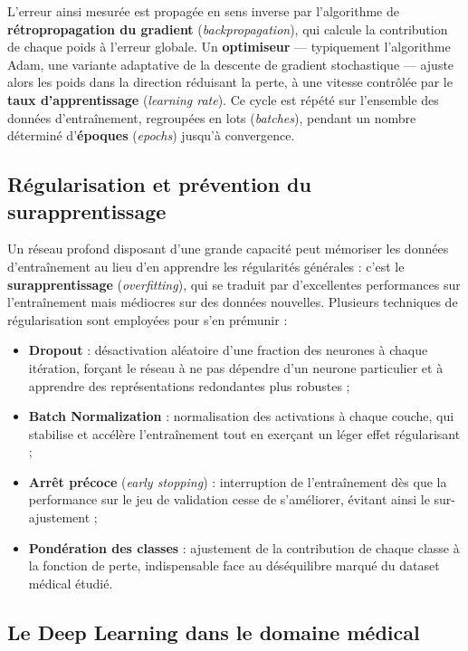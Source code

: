 \documentclass[12pt,a4paper]{report}
\begin{document}
L'erreur ainsi mesurée est propagée en sens inverse par l'algorithme de
\textbf{rétropropagation du gradient} (\textit{backpropagation}), qui calcule la
contribution de chaque poids à l'erreur globale. Un \textbf{optimiseur} — typiquement
l'algorithme Adam, une variante adaptative de la descente de gradient stochastique —
ajuste alors les poids dans la direction réduisant la perte, à une vitesse contrôlée
par le \textbf{taux d'apprentissage} (\textit{learning rate}). Ce cycle est répété
sur l'ensemble des données d'entraînement, regroupées en lots (\textit{batches}),
pendant un nombre déterminé d'\textbf{époques} (\textit{epochs}) jusqu'à convergence.

\subsection{Régularisation et prévention du surapprentissage}

Un réseau profond disposant d'une grande capacité peut mémoriser les données
d'entraînement au lieu d'en apprendre les régularités générales : c'est le
\textbf{surapprentissage} (\textit{overfitting}), qui se traduit par d'excellentes
performances sur l'entraînement mais médiocres sur des données nouvelles. Plusieurs
techniques de régularisation sont employées pour s'en prémunir :

\begin{itemize}
  \item \textbf{Dropout} : désactivation aléatoire d'une fraction des neurones à
    chaque itération, forçant le réseau à ne pas dépendre d'un neurone particulier
    et à apprendre des représentations redondantes plus robustes \cite{goodfellow2016} ;
  \item \textbf{Batch Normalization} : normalisation des activations à chaque couche,
    qui stabilise et accélère l'entraînement tout en exerçant un léger effet
    régularisant ;
  \item \textbf{Arrêt précoce} (\textit{early stopping}) : interruption de
    l'entraînement dès que la performance sur le jeu de validation cesse de
    s'améliorer, évitant ainsi le sur-ajustement ;
  \item \textbf{Pondération des classes} : ajustement de la contribution de chaque
    classe à la fonction de perte, indispensable face au déséquilibre marqué du
    dataset médical étudié.
\end{itemize}

\subsection{Le Deep Learning dans le domaine médical}
\end{document}

